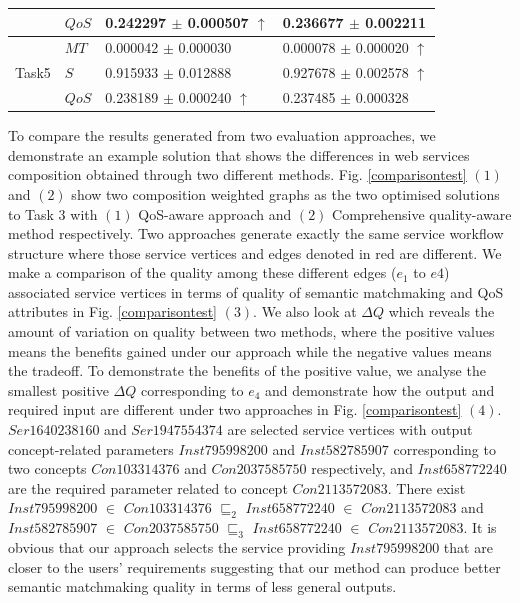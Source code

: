 \documentclass{IEEEtran}
\begin{document}
\begin{table}[]
\begin{tabular}{l|l|l|l}
                        &$QoS$  &0.242297 $\pm$ 0.000507 $\uparrow$    &0.236677 $\pm$ 0.002211  \\ \hline
\multirow{3}{*}{Task5}  &$MT$   &  0.000042 $\pm$ 0.000030             &0.000078 $\pm$ 0.000020 $\uparrow$           \\ \cline{2-4} 
                        &$S$    &  0.915933 $\pm$ 0.012888             &0.927678 $\pm$ 0.002578 $\uparrow$                 \\ \cline{2-4}
                        &$QoS$  & 0.238189 $\pm$ 0.000240 $\uparrow$      &  0.237485 $\pm$  0.000328  \\ \hline                                                   
\end{tabular}
\end{table}

To compare the results generated from two evaluation approaches, we demonstrate an example solution that shows the differences in web services composition obtained through two different methods. Fig. \ref{comparisontest} $(1)$ and $(2)$ show two composition weighted graphs as the two optimised solutions to Task 3 with $(1)$ QoS-aware approach and $(2)$ Comprehensive quality-aware method respectively. Two approaches generate exactly the same service workflow structure where those service vertices and edges denoted in red are different. We make a comparison of the quality among these different edges ($e_1$ to $e4$) associated service vertices in terms of quality of semantic matchmaking and QoS attributes in Fig. \ref{comparisontest} $(3)$. We also look at $\Delta Q$ which reveals the amount of variation on quality between two methods, where the positive values means the benefits gained under our approach while the negative values means the tradeoff. To demonstrate the benefits of the positive value, we analyse the smallest positive $\Delta Q$ corresponding to $e_4$ and demonstrate how the output and required input are different under two approaches in Fig. \ref{comparisontest} $(4)$. $Ser1640238160$ and $Ser1947554374$ are selected service vertices with output concept-related parameters $Inst795998200$ and $Inst582785907$ corresponding to two concepts $Con103314376$ and $Con2037585750$ respectively, and $Inst658772240$ are the required parameter related to concept $Con2113572083$. There exist $Inst795998200$ $\in$ $Con103314376$ $\sqsubseteq_{2}$ $Inst658772240$ $\in$ $Con2113572083$ and $Inst582785907$ $\in$ $Con2037585750$ $\sqsubseteq_{3}$ $Inst658772240$ $\in$ $Con2113572083$. It is obvious that our approach selects the service providing $Inst795998200$ that are closer to the users' requirements suggesting that our method can produce better semantic matchmaking quality in terms of less general outputs.
\end{document}
